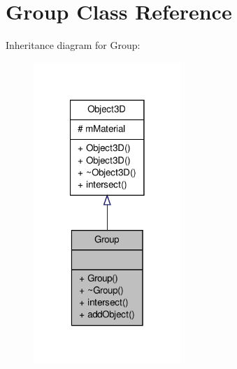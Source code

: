 \hypertarget{classGroup}{\section{\-Group \-Class \-Reference}
\label{classGroup}
}


\-Inheritance diagram for \-Group\-:
\nopagebreak
\begin{figure}[H]
\begin{center}
\leavevmode
\includegraphics[width=158pt]{classGroup__inherit__graph}
\end{center}
\end{figure}


